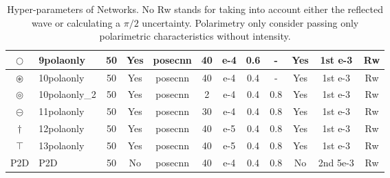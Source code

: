 \begin{table}[H]
\begin{sideways}
{\begin{tabular}{|c|Z|c|c|c|c|c|c|c|c|c|c|}
				$\bigcirc$           & 9polaonly     & 50 & Yes & posecnn & 40  & e-4 & 0.6 & -   & Yes & 1st e-3  & Rw    \\ \hline
				$\circledast$        & 10polaonly    & 50 & Yes & posecnn & 40  & e-4 & 0.4 & -   & Yes & 1st e-3  & Rw    \\ \hline
				$\circledcirc$       & 10polaonly\_2 & 50 & Yes & posecnn & 2   & e-4 & 0.4 & 0.8 & Yes & 1st e-3  & Rw    \\ \hline
				$\circleddash$       & 11polaonly    & 50 & Yes & posecnn & 30  & e-4 & 0.4 & 0.8 & Yes & 1st e-3  & Rw    \\ \hline
				$\dagger$            & 12polaonly    & 50 & Yes & posecnn & 40  & e-5 & 0.4 & 0.8 & Yes & 1st e-3  & Rw    \\ \hline
				$\intercal$          & 13polaonly    & 50 & Yes & posecnn & 40  & e-5 & 0.4 & 0.8 & Yes & 1st e-3  & Rw    \\ \hline
				P2D                  & P2D     & 50 & No  & posecnn & 40  & e-4 & 0.4 & 0.8 & No  & 2nd 5e-3 & Rw    \\ \hline
			\end{tabular}%
		}
	\end{sideways}
	\caption[Hyper-parameters of Networks]{Hyper-parameters of Networks. No Rw stands for taking into account either the reflected wave or calculating a $\pi/2$ uncertainty. Polarimetry only consider passing only polarimetric characteristics without intensity.}
	\label{tab:hyper}
\end{table}

\pagebreak
